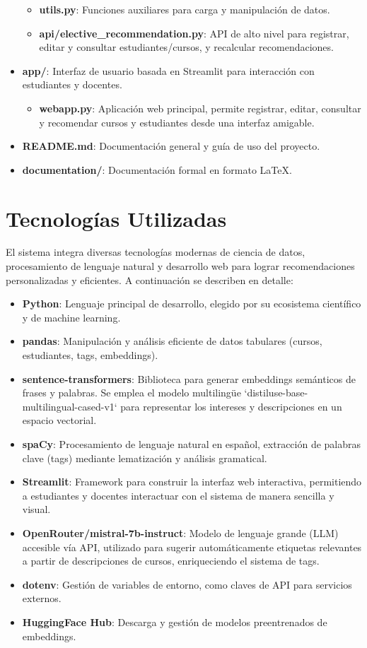 \documentclass[12pt]{article}
\begin{document}
\begin{itemize}
\begin{itemize}
        \item \textbf{utils.py}: Funciones auxiliares para carga y manipulación de datos.
        \item \textbf{api/elective\_recommendation.py}: API de alto nivel para registrar, editar y consultar estudiantes/cursos, y recalcular recomendaciones.
    \end{itemize}
    \item \textbf{app/}: Interfaz de usuario basada en Streamlit para interacción con estudiantes y docentes.
    \begin{itemize}
        \item \textbf{webapp.py}: Aplicación web principal, permite registrar, editar, consultar y recomendar cursos y estudiantes desde una interfaz amigable.
    \end{itemize}
    \item \textbf{README.md}: Documentación general y guía de uso del proyecto.
    \item \textbf{documentation/}: Documentación formal en formato \LaTeX{}.
\end{itemize}

\section{Tecnologías Utilizadas}
El sistema integra diversas tecnologías modernas de ciencia de datos, procesamiento de lenguaje natural y desarrollo web para lograr recomendaciones personalizadas y eficientes. A continuación se describen en detalle:

\begin{itemize}
    \item \textbf{Python}: Lenguaje principal de desarrollo, elegido por su ecosistema científico y de machine learning.
    \item \textbf{pandas}: Manipulación y análisis eficiente de datos tabulares (cursos, estudiantes, tags, embeddings).
    \item \textbf{sentence-transformers}: Biblioteca para generar embeddings semánticos de frases y palabras. Se emplea el modelo multilingüe `distiluse-base-multilingual-cased-v1` para representar los intereses y descripciones en un espacio vectorial.
    \item \textbf{spaCy}: Procesamiento de lenguaje natural en español, extracción de palabras clave (tags) mediante lematización y análisis gramatical.
    \item \textbf{Streamlit}: Framework para construir la interfaz web interactiva, permitiendo a estudiantes y docentes interactuar con el sistema de manera sencilla y visual.
    \item \textbf{OpenRouter/mistral-7b-instruct}: Modelo de lenguaje grande (LLM) accesible vía API, utilizado para sugerir automáticamente etiquetas relevantes a partir de descripciones de cursos, enriqueciendo el sistema de tags.
    \item \textbf{dotenv}: Gestión de variables de entorno, como claves de API para servicios externos.
    \item \textbf{HuggingFace Hub}: Descarga y gestión de modelos preentrenados de embeddings.
\end{itemize}
\end{document}
